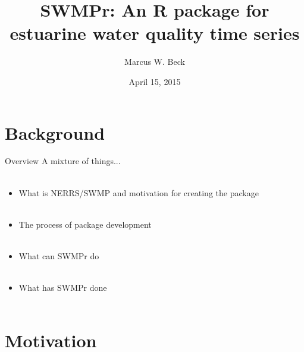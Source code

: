 \documentclass[serif]{beamer}\usepackage[]{graphicx}\usepackage[]{color}
\begin{document}
\title[SWMPr for estuarine time series]{SWMPr: An R package for estuarine water quality time series}

\author[M. Beck]{Marcus W. Beck}

\date{April 15, 2015}



\begin{frame}
\titlepage
\end{frame}

\section{Background}

\begin{frame}{Overview}
A mixture of things...\\~\\
\begin{itemize}
\item What is NERRS/SWMP and motivation for creating the package \\~\\
\item The process of package development \\~\\
\item What can SWMPr do \\~\\
\item What has SWMPr done \\~\\
\end{itemize}
\end{frame}

\section{Motivation}
\end{document}
